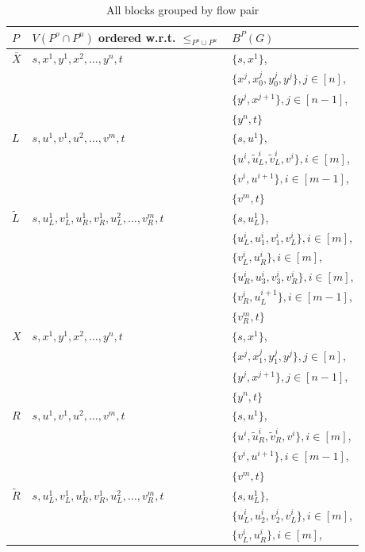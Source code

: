 \documentclass[fontsize=11pt,paper=a4]{book}
\begin{document}
\begin{table}[htbp]
\caption{\label{tab:org237f07e}All blocks grouped by flow pair}
\centering
\begin{tabular}{lll}
\(P\) & \(V(P^o\cap P^u)\) ordered w.r.t. \(\leq_{P^o\cup P^u}\) & \(B^P(G)\)\\[0pt]
\hline
\(\bar{X}\) & \(s,x^1,y^1,x^2,\dots,y^n,t\) & \(\{s,x^1\}\),\\[0pt]
 &  & \(\{x^j,x_0^j,y_0^j,y^j\},j\in[n]\),\\[0pt]
 &  & \(\{y^j,x^{j+1}\},j\in[n-1]\),\\[0pt]
 &  & \(\{y^n,t\}\)\\[0pt]
\hline
\(L\) & \(s,u^1,v^1,u^2,\dots,v^m,t\) & \(\{s,u^1\}\),\\[0pt]
 &  & \(\{u^i,\tilde{u}_L^i,\tilde{v}_L^i,v^i\},i\in[m]\),\\[0pt]
 &  & \(\{v^i,u^{i+1}\},i\in[m-1]\),\\[0pt]
 &  & \(\{v^m,t\}\)\\[0pt]
\hline
\(\tilde{L}\) & \(s,u_L^1,v_L^1,u_R^1,v_R^1,u_L^2,\dots,v_R^m,t\) & \(\{s,u_L^1\}\),\\[0pt]
 &  & \(\{u_L^i,u_1^i,v_1^i,v_L^i\},i\in[m]\),\\[0pt]
 &  & \(\{v_L^i,u_R^i\},i\in[m]\),\\[0pt]
 &  & \(\{u_R^i,u_3^i,v_3^i,v_R^i\},i\in[m]\),\\[0pt]
 &  & \(\{v_R^i,u_L^{i+1}\},i\in[m-1]\),\\[0pt]
 &  & \(\{v_R^m,t\}\)\\[0pt]
\hline
\(X\) & \(s,x^1,y^1,x^2,\dots,y^n,t\) & \(\{s,x^1\}\),\\[0pt]
 &  & \(\{x^j,x_1^j,y_1^j,y^j\},j\in[n]\),\\[0pt]
 &  & \(\{y^j,x^{j+1}\},j\in[n-1]\),\\[0pt]
 &  & \(\{y^n,t\}\)\\[0pt]
\hline
\(R\) & \(s,u^1,v^1,u^2,\dots,v^m,t\) & \(\{s,u^1\}\),\\[0pt]
 &  & \(\{u^i,\tilde{u}_R^i,\tilde{v}_R^i,v^i\},i\in[m]\),\\[0pt]
 &  & \(\{v^i,u^{i+1}\},i\in[m-1]\),\\[0pt]
 &  & \(\{v^m,t\}\)\\[0pt]
\hline
\(\tilde{R}\) & \(s,u_L^1,v_L^1,u_R^1,v_R^1,u_L^2,\dots,v_R^m,t\) & \(\{s,u_L^1\}\),\\[0pt]
 &  & \(\{u_L^i,u_2^i,v_2^i,v_L^i\},i\in[m]\),\\[0pt]
 &  & \(\{v_L^i,u_R^i\},i\in[m]\),\\[0pt]

\end{tabular}
\end{table}
\end{document}
